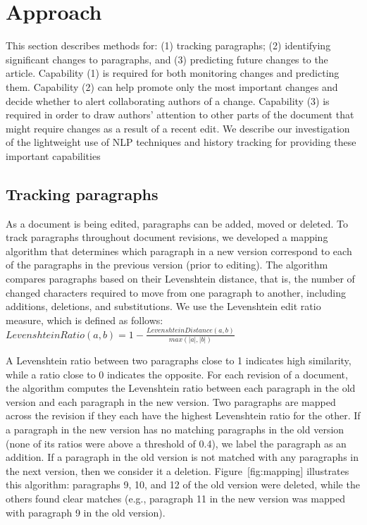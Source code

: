 \section{Approach}\label{approach}

This section describes methods for: (1) tracking paragraphs; (2)
identifying significant changes to paragraphs, and (3) predicting future
changes to the article. Capability (1) is required for both monitoring
changes and predicting them. Capability (2) can help promote only the
most important changes and decide whether to alert collaborating authors
of a change. Capability (3) is required in order to draw authors'
attention to other parts of the document that might require changes as a
result of a recent edit. We describe our investigation of the
lightweight use of NLP techniques and history tracking for providing
these important capabilities

\subsection{Tracking paragraphs}\label{tracking-paragraphs}

As a document is being edited, paragraphs can be added, moved or
deleted. To track paragraphs throughout document revisions, we developed
a mapping algorithm that determines which paragraph in a new version
correspond to each of the paragraphs in the previous version (prior to
editing). The algorithm compares paragraphs based on their Levenshtein
distance, that is, the number of changed characters required to move
from one paragraph to another, including additions, deletions, and
substitutions. We use the Levenshtein edit ratio measure, which is
defined as follows:
\(Levenshtein Ratio(a,b) = 1-\frac{Levenshtein Distance(a,b)}{max(|a|,|b|)} \)

A Levenshtein ratio between two paragraphs close to 1 indicates high
similarity, while a ratio close to 0 indicates the opposite. For each
revision of a document, the algorithm computes the Levenshtein ratio
between each paragraph in the old version and each paragraph in the new
version. Two paragraphs are mapped across the revision if they each have
the highest Levenshtein ratio for the other. If a paragraph in the new
version has no matching paragraphs in the old version (none of its
ratios were above a threshold of 0.4), we label the paragraph as an
addition. If a paragraph in the old version is not matched with any
paragraphs in the next version, then we consider it a deletion.
Figure~{[}fig:mapping{]} illustrates this algorithm: paragraphs 9, 10,
and 12 of the old version were deleted, while the others found clear
matches (e.g., paragraph 11 in the new version was mapped with paragraph
9 in the old version).

